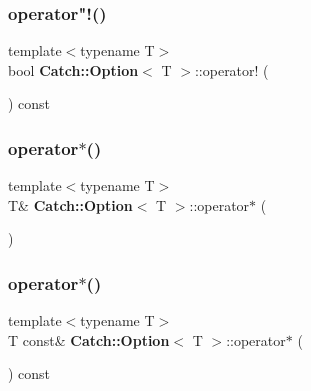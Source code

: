 \subsubsection{operator"!()}
{\footnotesize\ttfamily template$<$typename T$>$ \\
bool \textbf{ Catch\+::\+Option}$<$ T $>$\+::operator! (\begin{DoxyParamCaption}{ }\end{DoxyParamCaption}) const\hspace{0.3cm}{\ttfamily [inline]}}

\mbox{\label{class_catch_1_1_option_afd989852fa453731c3190dac63caccb0}} 
\subsubsection{operator$\ast$()\hspace{0.1cm}{\footnotesize\ttfamily [1/2]}}
{\footnotesize\ttfamily template$<$typename T$>$ \\
T\& \textbf{ Catch\+::\+Option}$<$ T $>$\+::operator$\ast$ (\begin{DoxyParamCaption}{ }\end{DoxyParamCaption})\hspace{0.3cm}{\ttfamily [inline]}}

\mbox{\label{class_catch_1_1_option_a734fc9c2eb1a1f7f8e8f6a4eb12160f0}} 
\subsubsection{operator$\ast$()\hspace{0.1cm}{\footnotesize\ttfamily [2/2]}}
{\footnotesize\ttfamily template$<$typename T$>$ \\
T const\& \textbf{ Catch\+::\+Option}$<$ T $>$\+::operator$\ast$ (\begin{DoxyParamCaption}{ }\end{DoxyParamCaption}) const\hspace{0.3cm}{\ttfamily [inline]}}

\mbox{\label{class_catch_1_1_option_acad340798a16c8f700f8763119e90f31}} 
